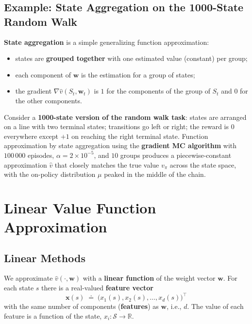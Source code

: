 \documentclass[11pt,a4paper]{article}
\theoremstyle{definition}
\theoremstyle{plain}
\theoremstyle{remark}
\begin{document}
\subsection{Example: State Aggregation on the 1000-State Random Walk}

\textbf{State aggregation} is a simple generalizing function approximation:
\begin{itemize}
    \item states are \textbf{grouped together} with one estimated value (constant) per group;
    \item each component of $\mathbf{w}$ is the estimation for a group of states;
    \item the gradient $\nabla \hat{v}(S_t, \mathbf{w}_t)$ is $1$ for the components of the group of $S_t$ and $0$ for the other components.
\end{itemize}

Consider a \textbf{1000-state version of the random walk task}: states are arranged on a line with two terminal states; transitions go left or right; the reward is $0$ everywhere except $+1$ on reaching the right terminal state. Function approximation by state aggregation using the \textbf{gradient MC algorithm} with $100\,000$ episodes, $\alpha = 2 \times 10^{-5}$, and $10$ groups produces a piecewise-constant approximation $\hat{v}$ that closely matches the true value $v_\pi$ across the state space, with the on-policy distribution $\mu$ peaked in the middle of the chain.

\section{Linear Value Function Approximation}

\subsection{Linear Methods}

We approximate $\hat{v}(\cdot, \mathbf{w})$ with a \textbf{linear function} of the weight vector $\mathbf{w}$. For each state $s$ there is a real-valued \textbf{feature vector}
\[
    \mathbf{x}(s) \;\doteq\; \bigl(x_1(s), x_2(s), \ldots, x_d(s)\bigr)^\top
\]
with the same number of components (\textbf{features}) as $\mathbf{w}$, i.e., $d$. The value of each feature is a function of the state, $x_i : \mathcal{S} \to \mathbb{R}$.
\end{document}
